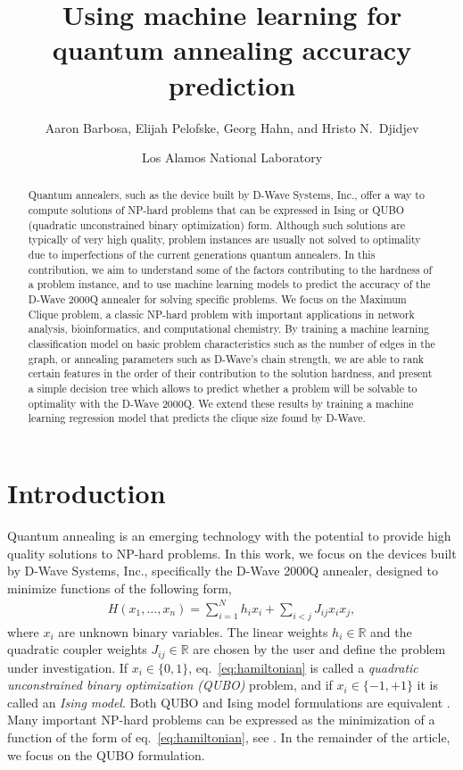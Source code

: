 \documentclass[a4paper,11pt]{article}
\newcommand{\R}{\ensuremath{\mathbb{R}}}
\begin{document}
\onehalfspacing
\title{Using machine learning for quantum annealing accuracy prediction}
\author{Aaron Barbosa, Elijah Pelofske, Georg Hahn, and Hristo N.\ Djidjev}
\date{Los Alamos National Laboratory}
\maketitle



\begin{abstract}
	Quantum annealers, such as the device built by D-Wave Systems, Inc., offer a way to compute solutions of NP-hard problems that can be expressed in Ising or QUBO (quadratic unconstrained binary optimization) form. Although such solutions are typically of very high quality, problem instances are usually not solved to optimality due to imperfections of the current generations quantum annealers. In this contribution, we aim to understand some of the factors contributing to the hardness of a problem instance, and to use machine learning models to predict the accuracy of the D-Wave 2000Q annealer for solving specific problems. We focus on the Maximum Clique problem, a classic NP-hard problem with important applications in network analysis, bioinformatics, and computational chemistry. By training a machine learning classification model on basic problem characteristics such as the number of edges in the graph, or annealing parameters such as D-Wave's chain strength, we are able to rank certain features in the order of their contribution to the solution hardness, and present a simple decision tree which allows to predict whether a problem will be solvable to optimality with the D-Wave 2000Q. We extend these results by training a machine learning regression model that predicts the clique size found by D-Wave.
\end{abstract}



\section{Introduction}
\label{sec:introduction}
Quantum annealing is an emerging technology with the potential to provide high quality solutions to NP-hard problems. In this work, we focus on the devices built by D-Wave Systems, Inc., specifically the D-Wave 2000Q annealer, designed to minimize functions of the following form,
\begin{align}
    H(x_1,\ldots,x_n) = \sum_{i=1}^N h_i x_i + \sum_{i<j} J_{ij} x_i x_j,
    \label{eq:hamiltonian}
\end{align}
where $x_i$ are unknown binary variables. The linear weights $h_i \in \R$ and the quadratic coupler weights $J_{ij} \in \R$ are chosen by the user and define the problem under investigation. If $x_i \in \{0,1\}$, eq.~\eqref{eq:hamiltonian} is called a \textit{quadratic unconstrained binary optimization (QUBO)} problem, and if $x_i \in \{-1,+1\}$ it is called an \textit{Ising model}. Both QUBO and Ising model formulations are equivalent \cite{Chapuis2019}. Many important NP-hard problems can be expressed as the minimization of a function of the form of eq.~\eqref{eq:hamiltonian}, see \cite{Lucas2014}. In the remainder of the article, we focus on the QUBO formulation.
\end{document}
